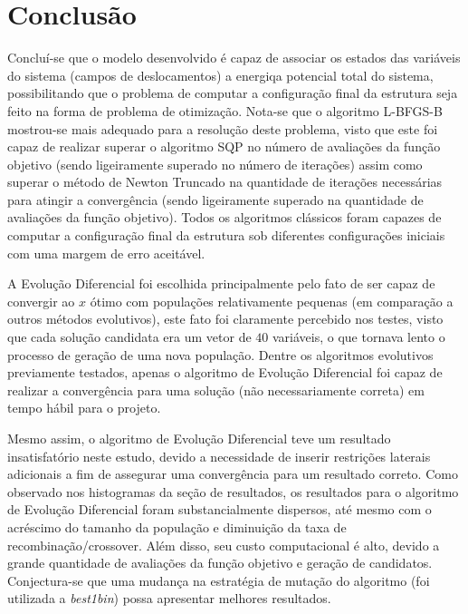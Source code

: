 \documentclass{article}
\begin{document}
\section{Conclusão}
Concluí-se que o modelo desenvolvido é capaz de associar os estados das variáveis do sistema (campos de deslocamentos) a energiqa potencial total do sistema, possibilitando que o problema de computar a configuração final da estrutura seja feito na forma de problema de otimização. Nota-se que o algoritmo L-BFGS-B mostrou-se mais adequado para a resolução deste problema, visto que este foi capaz de realizar superar o algoritmo SQP no número de avaliações da função objetivo (sendo ligeiramente superado no número de iterações) assim como superar o método de Newton Truncado na quantidade de iterações necessárias para atingir a convergência (sendo ligeiramente superado na quantidade de avaliações da função objetivo). Todos os algoritmos clássicos foram capazes de computar a configuração final da estrutura sob diferentes configurações iniciais com uma margem de erro aceitável. \newline

A Evolução Diferencial foi escolhida principalmente pelo fato de ser capaz de convergir ao $x$ ótimo com populações relativamente pequenas (em comparação a outros métodos evolutivos), este fato foi claramente percebido nos testes, visto que cada solução candidata era um vetor de $40$ variáveis, o que tornava lento o processo de geração de uma nova população. Dentre os algoritmos evolutivos previamente testados, apenas o algoritmo de Evolução Diferencial foi  capaz de realizar a convergência para uma solução (não necessariamente correta) em tempo hábil para o projeto.\newline

Mesmo assim, o algoritmo de Evolução Diferencial teve um resultado insatisfatório neste estudo, devido a necessidade de inserir restrições laterais adicionais a fim de assegurar uma convergência para um resultado correto. Como observado nos histogramas da seção de resultados, os resultados para o algoritmo de Evolução Diferencial foram substancialmente dispersos, até mesmo com o acréscimo do tamanho da população e diminuição da taxa de recombinação/crossover. Além disso, seu custo computacional é alto, devido a grande quantidade de avaliações da função objetivo e geração de candidatos. Conjectura-se que uma mudança na estratégia de mutação do algoritmo (foi utilizada a \textit{best1bin}) possa apresentar melhores resultados.


\end{document}

